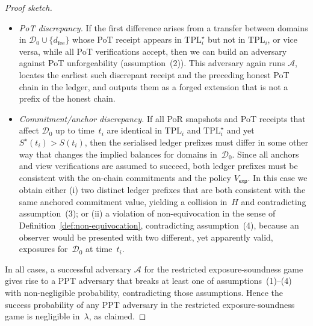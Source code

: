 \documentclass[11pt]{article}
\begin{document}
\begin{proof}[Proof sketch]
\begin{itemize}[noitemsep]
  \item \emph{PoT discrepancy.}
        If the first difference arises from a transfer between domains in
        $\mathcal{D}_0 \cup \{d_{\mathrm{fee}}\}$ whose PoT receipt appears in
        $\mathrm{TPL}^\star_i$ but not in $\mathrm{TPL}_i$, or vice versa,
        while all PoT verifications accept, then we can build an adversary
        against PoT unforgeability (assumption~(2)).
        This adversary again runs $\mathcal{A}$, locates the earliest such
        discrepant receipt and the preceding honest PoT chain in the ledger,
        and outputs them as a forged extension that is not a prefix of the
        honest chain.

  \item \emph{Commitment/anchor discrepancy.}
        If all PoR snapshots and PoT receipts that affect
        $\mathcal{D}_0$ up to time~$t_i$ are identical in $\mathrm{TPL}_i$
        and $\mathrm{TPL}^\star_i$ and yet $S^\star(t_i) > S(t_i)$, then the
        serialised ledger prefixes must differ in some other way that changes
        the implied balances for domains in~$\mathcal{D}_0$.
        Since all anchors and view verifications are assumed to succeed,
        both ledger prefixes must be consistent with the on-chain commitments
        and the policy $V_{\mathsf{exp}}$.
        In this case we obtain either
        (i) two distinct ledger prefixes that are both consistent with the
        same anchored commitment value, yielding a collision in~$H$ and
        contradicting assumption~(3); or
        (ii) a violation of non-equivocation in the sense of
        Definition~\ref{def:non-equivocation}, contradicting assumption~(4),
        because an observer would be presented with two different, yet
        apparently valid, exposures for~$\mathcal{D}_0$ at time~$t_i$.
\end{itemize}

In all cases, a successful adversary $\mathcal{A}$ for the restricted
exposure-soundness game gives rise to a PPT adversary that breaks at least one
of assumptions~(1)--(4) with non-negligible probability, contradicting those
assumptions.
Hence the success probability of any PPT adversary in the restricted
exposure-soundness game is negligible in~$\lambda$, as claimed.
\end{proof}
\end{document}
